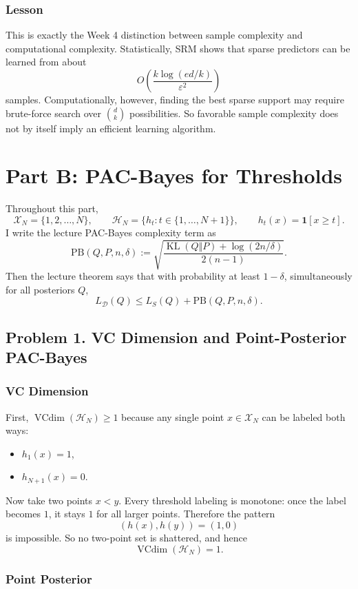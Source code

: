 \documentclass{article}
\DeclareMathOperator{\VC}{VCdim}
\DeclareMathOperator{\KL}{KL}
\newcommand{\cH}{\mathcal{H}}
\newcommand{\cD}{\mathcal{D}}
\newcommand{\cX}{\mathcal{X}}
\begin{document}
\subsubsection{Lesson}

This is exactly the Week 4 distinction between sample complexity and computational complexity. Statistically, SRM shows that sparse predictors can be learned from about
$$
O\!\left(\frac{k\log(ed/k)}{\varepsilon^2}\right)
$$
samples. Computationally, however, finding the best sparse support may require brute-force search over $\binom{d}{k}$ possibilities. So favorable sample complexity does not by itself imply an efficient learning algorithm.

\newpage
\section{Part B: PAC-Bayes for Thresholds}

Throughout this part,
$$
\cX_N=\{1,2,\dots,N\},
\qquad
\cH_N=\{h_t:t\in\{1,\dots,N+1\}\},
\qquad
h_t(x)=\mathbf{1}[x\ge t].
$$
I write the lecture PAC-Bayes complexity term as
$$
\mathrm{PB}(Q,P,n,\delta)
:=
\sqrt{
\frac{
\KL(Q\Vert P)+\log(2n/\delta)
}{
2(n-1)
}
}.
$$
Then the lecture theorem says that with probability at least $1-\delta$, simultaneously for all posteriors $Q$,
$$
L_{\cD}(Q)\le L_S(Q)+\mathrm{PB}(Q,P,n,\delta).
$$

\subsection{Problem 1. VC Dimension and Point-Posterior PAC-Bayes}

\subsubsection{VC Dimension}

First, $\VC(\cH_N)\ge 1$ because any single point $x\in\cX_N$ can be labeled both ways:
\begin{itemize}
\item $h_1(x)=1$,
\item $h_{N+1}(x)=0$.
\end{itemize}

Now take two points $x<y$. Every threshold labeling is monotone: once the label becomes $1$, it stays $1$ for all larger points. Therefore the pattern
$$
(h(x),h(y))=(1,0)
$$
is impossible. So no two-point set is shattered, and hence
$$
\VC(\cH_N)=1.
$$

\subsubsection{Point Posterior}
\end{document}
